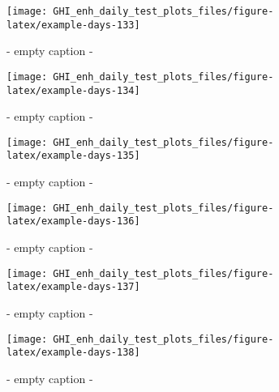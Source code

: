 \documentclass[
  10pt,
  a4paper,oneside]{article}
\begin{document}
\begin{figure}[H]

{\centering \texttt{[image: GHI\_enh\_daily\_test\_plots\_files/figure-latex/example-days-133]} 

}

\caption{ - empty caption - }\label{fig:example-days-133}
\end{figure}

\begin{figure}[H]

{\centering \texttt{[image: GHI\_enh\_daily\_test\_plots\_files/figure-latex/example-days-134]} 

}

\caption{ - empty caption - }\label{fig:example-days-134}
\end{figure}

\begin{figure}[H]

{\centering \texttt{[image: GHI\_enh\_daily\_test\_plots\_files/figure-latex/example-days-135]} 

}

\caption{ - empty caption - }\label{fig:example-days-135}
\end{figure}

\begin{figure}[H]

{\centering \texttt{[image: GHI\_enh\_daily\_test\_plots\_files/figure-latex/example-days-136]} 

}

\caption{ - empty caption - }\label{fig:example-days-136}
\end{figure}

\begin{figure}[H]

{\centering \texttt{[image: GHI\_enh\_daily\_test\_plots\_files/figure-latex/example-days-137]} 

}

\caption{ - empty caption - }\label{fig:example-days-137}
\end{figure}

\begin{figure}[H]

{\centering \texttt{[image: GHI\_enh\_daily\_test\_plots\_files/figure-latex/example-days-138]} 

}

\caption{ - empty caption - }\label{fig:example-days-138}
\end{figure}
\end{document}
